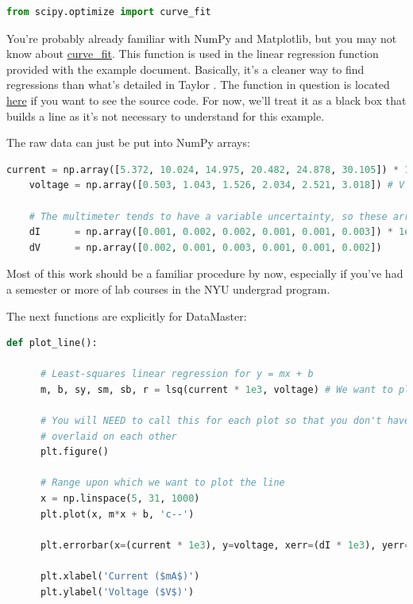 \documentclass[12pt]{article}
\begin{document}
{\begin{framed}
\begin{lstlisting}[language=Python]
    from scipy.optimize import curve_fit
  \end{lstlisting}
\end{framed}

You're probably already familiar with NumPy and Matplotlib, but you may not know about \href{http://bit.ly/2qUN5Ci}{curve\_fit}. This function is used in the linear regression function provided with the example document. Basically, it's a cleaner way to find regressions than what's detailed in Taylor \cite{taylor_error}. The function in question is located \href{http://bit.ly/2pe8JEq}{here} if you want to see the source code. For now, we'll treat it as a black box that builds a line as it's not necessary to understand for this example.

The raw data can just be put into NumPy arrays:
\begin{framed}
  \begin{lstlisting}[language=Python]
    current = np.array([5.372, 10.024, 14.975, 20.482, 24.878, 30.105]) * 1e-3 # mA
    voltage = np.array([0.503, 1.043, 1.526, 2.034, 2.521, 3.018]) # V

    # The multimeter tends to have a variable uncertainty, so these arrays is needed
    dI      = np.array([0.001, 0.002, 0.002, 0.001, 0.001, 0.003]) * 1e-3
    dV      = np.array([0.002, 0.001, 0.003, 0.001, 0.001, 0.002])
  \end{lstlisting}
\end{framed}
Most of this work should be a familiar procedure by now, especially if you've had a semester or more of lab courses in the NYU undergrad program.

The next functions are explicitly for DataMaster:
\begin{framed}
  \begin{lstlisting}[language=Python]
    def plot_line():

      # Least-squares linear regression for y = mx + b
      m, b, sy, sm, sb, r = lsq(current * 1e3, voltage) # We want to plot in mA

      # You will NEED to call this for each plot so that you don't have multiple plots
      # overlaid on each other
      plt.figure()

      # Range upon which we want to plot the line
      x = np.linspace(5, 31, 1000)
      plt.plot(x, m*x + b, 'c--')

      plt.errorbar(x=(current * 1e3), y=voltage, xerr=(dI * 1e3), yerr=dV, fmt='r.', ecolor='k', alpha=0.5)

      plt.xlabel('Current ($mA$)')
      plt.ylabel('Voltage ($V$)')


\end{lstlisting}
\end{framed}}
\end{document}
